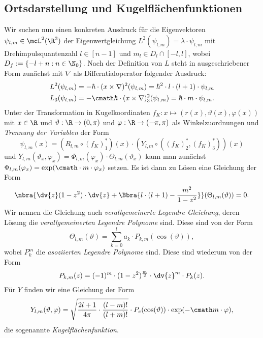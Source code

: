 \documentclass{subfiles}
\begin{document}
    \subsection{Ortsdarstellung und Kugelflächenfunktionen}
        Wir suchen nun einen konkreten Ausdruck für die Eigenvektoren $\psi_{l,m}\in\mcL^2(\R^3)$ der Eigenwertgleichung $L^2(\psi_{l,m}) = \lambda\cdot \psi_{l,m}$ mit Drehimpulsquantenzahl $l\in[n-1]$ und $m_l\in D_l\cap [-l,l]$, wobei $D_f:=\{-l + n:n\in\N_0\}$. Nach der Definition von $L$ steht in ausgeschriebener Form zunächst mit $\nabla$ als Differntialoperator folgender Ausdruck:
        \begin{align*}
            L^2(\psi_{l,m}) &= -\hbar\cdot(x\times \nabla)^2(\psi_{l,m}) = \hbar^2\cdot l\cdot (l+1)\cdot \psi_{l,m}\\
            L_3(\psi_{l,m}) &= -\cmath\hbar\cdot (x\times \nabla)_3^2(\psi_{l,m}) = \hbar\cdot m\cdot \psi_{l,m}.
        \end{align*}
        Unter der Transformation in Kugelkoordinaten $f_K:x\mapsto (r(x),\vartheta(x),\varphi(x))$ mit $x\in\R$ und $\vartheta:\R\to (0,\pi)$ und $\varphi:\R\to (-\pi,\pi)$ als Winkelzuordnungen und \emph{Trennung der Variablen} der Form  
        \[
            \psi_{l,m}(x) = (R_{l,m}\circ (f_K)_1^*)(x)\cdot (Y_{l,m}\circ ((f_K)_2^*,(f_K)_3^*))(x)
        \]
        und $Y_{l,m}(\vartheta_x,\varphi_x) = \Phi_{l,m}(\varphi_x)\cdot\Theta_{l,m}(\vartheta_x)$ kann man zunächst $\Phi_{l,m}(\varphi_x) = \exp(\cmath\cdot m\cdot\varphi_x)$ setzen. Es ist dann zu Lösen eine Gleichung der Form 
        \[
            \nbra{\dv{z}(1-z^2)\cdot\dv{z} + \Bbra{l\cdot(l+1) - \frac{m^2}{1-z^2}}}(\Theta_{l,m}(\vartheta)) = 0.
        \]
        Wir nennen die Gleichung auch \emph{verallgemeinerte Legendre Gleichung}, deren Lösung die \emph{verallgemeinerten Legendre Polynome} sind. Diese sind von der Form
        \[
            \Theta_{l,m}(\vartheta) = \sum_{k=0}^l a_k\cdot P_{k,m}(\cos(\vartheta)),
        \]
        wobei $P_k^m$ die \emph{asoziierten Legendre Polynome} sind. Diese sind wiederum von der Form
        \[
            P_{k,m}(z) = (-1)^m\cdot(1-z^2)^{\frac{m}{2}}\cdot\dv{z}^m\cdot P_k(z).
        \]
        Für $Y$ finden wir eine Gleichung der Form
        \[
            Y_{l,m}(\vartheta,\varphi) = \sqrt{\frac{2l + 1}{4\pi}\cdot\frac{(l-m)!}{(l+m)!}}\cdot P_e(\cos(\vartheta))\cdot\exp(-\cmath m\cdot\varphi),
        \]
        die sogenannte \emph{Kugelflächenfunktion}. 
\end{document}

